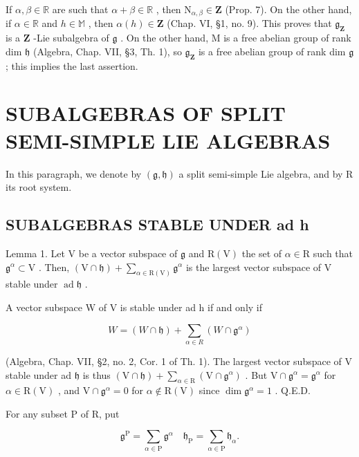If \(\alpha, \beta \in \mathbb{R}\) are such that \(\alpha + \beta \in \mathbb{R}\) , then \(\mathrm{N}_{\alpha, \beta} \in \mathbf{Z}\) (Prop. 7). On the other hand, if \(\alpha \in \mathbb{R}\) and \(h \in \mathbb{M}\) , then \(\alpha(h) \in \mathbf{Z}\) (Chap. VI, §1, no. 9). This proves that \(\mathfrak{g}_{\mathbf{Z}}\) is a \(\mathbf{Z}\) -Lie subalgebra of \(\mathfrak{g}\) . On the other hand, M is a free abelian group of rank dim \(\mathfrak{h}\) (Algebra, Chap. VII, §3, Th. 1), so \(\mathfrak{g}_{\mathbf{Z}}\) is a free abelian group of rank dim \(\mathfrak{g}\) ; this implies the last assertion.

\section{SUBALGEBRAS OF SPLIT SEMI-SIMPLE LIE ALGEBRAS}

In this paragraph, we denote by \((\mathfrak{g},\mathfrak{h})\) a split semi-simple Lie algebra, and by R its root system.

\subsection{SUBALGEBRAS STABLE UNDER ad h}

Lemma 1. Let \(\mathrm{V}\) be a vector subspace of \(\mathfrak{g}\) and \(\mathrm{R(V)}\) the set of \(\alpha \in \mathrm{R}\) such that \(\mathfrak{g}^{\alpha} \subset \mathrm{V}\) . Then, \((\mathrm{V} \cap \mathfrak{h}) + \sum_{\alpha \in \mathrm{R(V)}} \mathfrak{g}^{\alpha}\) is the largest vector subspace of \(\mathrm{V}\) stable under \(\operatorname{ad} \mathfrak{h}\) .

A vector subspace W of V is stable under ad h if and only if

\[
W = (W \cap \mathfrak {h}) + \sum_ {\alpha \in R} (W \cap \mathfrak {g} ^ {\alpha})
\]

(Algebra, Chap. VII, §2, no. 2, Cor. 1 of Th. 1). The largest vector subspace of V stable under ad \(\mathfrak{h}\) is thus \((\mathrm{V} \cap \mathfrak{h}) + \sum_{\alpha \in \mathrm{R}} (\mathrm{V} \cap \mathfrak{g}^{\alpha})\) . But \(\mathrm{V} \cap \mathfrak{g}^{\alpha} = \mathfrak{g}^{\alpha}\) for \(\alpha \in \mathrm{R}(\mathrm{V})\) , and \(\mathrm{V} \cap \mathfrak{g}^{\alpha} = 0\) for \(\alpha \notin \mathrm{R}(\mathrm{V})\) since \(\dim \mathfrak{g}^{\alpha} = 1\) . Q.E.D.

For any subset P of R, put

\[
\mathfrak {g} ^ {\mathrm{P}} = \sum_ {\alpha \in \mathrm{P}} \mathfrak {g} ^ {\alpha} \quad \mathfrak {h} _ {\mathrm{P}} = \sum_ {\alpha \in \mathrm{P}} \mathfrak {h} _ {\alpha}.
\]

